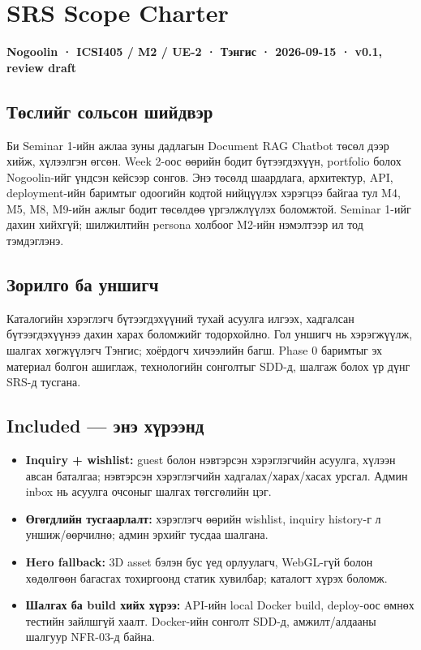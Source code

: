 \documentclass[
  11pt,
  a4paper,
]{article}
\author{}
\date{}
\providecommand{\tightlist}{%
  \setlength{\itemsep}{0pt}\setlength{\parskip}{0pt}}
\begin{document}
\section{SRS Scope Charter}\label{doc1-srs-scope-charter}

\textbf{Nogoolin · ICSI405 / M2 / UE-2 · Тэнгис · 2026-09-15 · v0.1,
review draft}

\subsection{Төслийг сольсон
шийдвэр}\label{doc1-ux442ux4e9ux441ux43bux438ux439ux433-ux441ux43eux43bux44cux441ux43eux43d-ux448ux438ux439ux434ux432ux44dux440}

Би Seminar 1-ийн ажлаа зуны дадлагын Document RAG Chatbot төсөл дээр
хийж, хүлээлгэн өгсөн. Week 2-оос өөрийн бодит бүтээгдэхүүн, portfolio
болох Nogoolin-ийг үндсэн кейсээр сонгов. Энэ төсөлд шаардлага,
архитектур, API, deployment-ийн баримтыг одоогийн кодтой нийцүүлэх
хэрэгцээ байгаа тул M4, M5, M8, M9-ийн ажлыг бодит төсөлдөө үргэлжлүүлэх
боломжтой. Seminar 1-ийг дахин хийхгүй; шилжилтийн persona холбоог
M2-ийн нэмэлтээр ил тод тэмдэглэнэ.

\subsection{Зорилго ба
уншигч}\label{doc1-ux437ux43eux440ux438ux43bux433ux43e-ux431ux430-ux443ux43dux448ux438ux433ux447}

Каталогийн хэрэглэгч бүтээгдэхүүний тухай асуулга илгээх, хадгалсан
бүтээгдэхүүнээ дахин харах боломжийг тодорхойлно. Гол уншигч нь
хэрэгжүүлж, шалгах хөгжүүлэгч Тэнгис; хоёрдогч хичээлийн багш. Phase 0 баримтыг эх материал болгон ашиглаж,
технологийн сонголтыг SDD-д, шалгаж болох үр дүнг SRS-д тусгана.

\subsection{Included --- энэ
хүрээнд}\label{doc1-included-ux44dux43dux44d-ux445ux4afux440ux44dux44dux43dux434}

\begin{itemize}
\tightlist
\item
  \textbf{Inquiry + wishlist:} guest болон нэвтэрсэн хэрэглэгчийн
  асуулга, хүлээн авсан баталгаа; нэвтэрсэн хэрэглэгчийн
  хадгалах/харах/хасах урсгал. Админ inbox нь асуулга очсоныг шалгах
  төгсгөлийн цэг.
\item
  \textbf{Өгөгдлийн тусгаарлалт:} хэрэглэгч өөрийн wishlist, inquiry
  history-г л уншиж/өөрчилнө; админ эрхийг тусдаа шалгана.
\item
  \textbf{Hero fallback:} 3D asset бэлэн бус үед орлуулагч, WebGL-гүй
  болон хөдөлгөөн багасгах тохиргоонд статик хувилбар; каталогт хүрэх
  боломж.
\item
  \textbf{Шалгах ба build хийх хүрээ:} API-ийн local Docker build,
  deploy-оос өмнөх тестийн зайлшгүй хаалт. Docker-ийн сонголт SDD-д,
  амжилт/алдааны шалгуур NFR-03-д байна.
\end{itemize}
\end{document}
